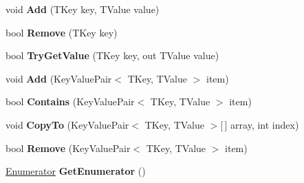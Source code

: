 \begin{DoxyCompactItemize}
\item 
void {\bfseries Add} (T\+Key key, T\+Value value)\hypertarget{class_serializable_dictionary_acba6f9abb062401c82f0db0b6375388a}{}\label{class_serializable_dictionary_acba6f9abb062401c82f0db0b6375388a}

\item 
bool {\bfseries Remove} (T\+Key key)\hypertarget{class_serializable_dictionary_aba4d57c71e51060c22d1f33a2c0e0714}{}\label{class_serializable_dictionary_aba4d57c71e51060c22d1f33a2c0e0714}

\item 
bool {\bfseries Try\+Get\+Value} (T\+Key key, out T\+Value value)\hypertarget{class_serializable_dictionary_af7ebdc24fdda4a27086e7abb0b891ecd}{}\label{class_serializable_dictionary_af7ebdc24fdda4a27086e7abb0b891ecd}

\item 
void {\bfseries Add} (Key\+Value\+Pair$<$ T\+Key, T\+Value $>$ item)\hypertarget{class_serializable_dictionary_a410b87ed40e0aba58ffe6742d0ee3981}{}\label{class_serializable_dictionary_a410b87ed40e0aba58ffe6742d0ee3981}

\item 
bool {\bfseries Contains} (Key\+Value\+Pair$<$ T\+Key, T\+Value $>$ item)\hypertarget{class_serializable_dictionary_a02837a6ad229db000ab464027cb01dd8}{}\label{class_serializable_dictionary_a02837a6ad229db000ab464027cb01dd8}

\item 
void {\bfseries Copy\+To} (Key\+Value\+Pair$<$ T\+Key, T\+Value $>$\mbox{[}$\,$\mbox{]} array, int index)\hypertarget{class_serializable_dictionary_a751f068f61a1fd5a44a191355128eacc}{}\label{class_serializable_dictionary_a751f068f61a1fd5a44a191355128eacc}

\item 
bool {\bfseries Remove} (Key\+Value\+Pair$<$ T\+Key, T\+Value $>$ item)\hypertarget{class_serializable_dictionary_a25b5c77a344bec665e6a237e1969284e}{}\label{class_serializable_dictionary_a25b5c77a344bec665e6a237e1969284e}

\item 
\hyperlink{struct_serializable_dictionary_1_1_enumerator}{Enumerator} {\bfseries Get\+Enumerator} ()\hypertarget{class_serializable_dictionary_ace0c6e4a403758404ee953fcbd36b7e8}{}\label{class_serializable_dictionary_ace0c6e4a403758404ee953fcbd36b7e8}

\end{DoxyCompactItemize}
